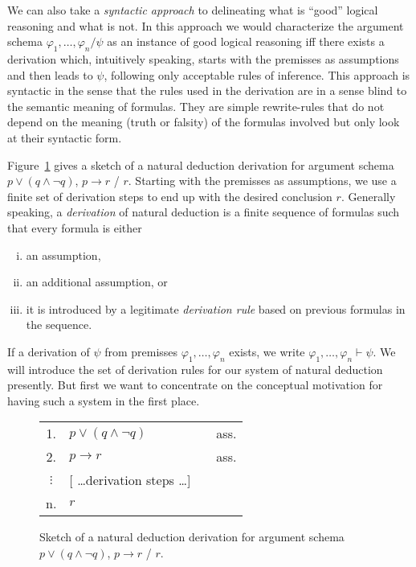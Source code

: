 \documentclass[nobib,nofonts]{tufte-handout}
\newcommand{\mygray}[1]{\textcolor{mygray2}{#1}}
\begin{document}
We can also take a \emph{syntactic approach} to delineating what is ``good'' logical reasoning and what is not.
In this approach we would characterize the argument schema $\varphi_{1}, \dots, \varphi_{n} / \psi$ as an instance of good logical reasoning iff there exists a derivation which, intuitively speaking, starts with the premisses as assumptions and then leads to $\psi$, following only acceptable rules of inference.
This approach is syntactic in the sense that the rules used in the derivation are in a sense blind to the semantic meaning of formulas.
They are simple rewrite-rules that do not depend on the meaning (truth or falsity) of the formulas involved but only look at their syntactic form.



Figure~\ref{fig:deduction-schema} gives a sketch of a natural deduction derivation for argument schema $p \vee (q \wedge \neg q)$, $p \rightarrow r$ / $r$.
Starting with the premisses as assumptions, we use a finite set of derivation steps to end up with the desired conclusion $r$.
Generally speaking, a \emph{derivation} of natural deduction is a finite sequence of formulas such that every formula is either
\begin{enumerate}[(i)]
  \item an assumption,
  \item an additional assumption, or
  \item it is introduced by a legitimate \emph{derivation rule} based on previous formulas in the sequence.
\end{enumerate}
If a derivation of $\psi$ from premisses $\varphi_{1}, \dots, \varphi_{n}$ exists, we write $\varphi_{1}, \dots, \varphi_{n} \vdash \psi$.
We will introduce the set of derivation rules for our system of natural deduction presently. But first we want to concentrate on the conceptual motivation for having such a system in the first place.

\begin{figure}
  \centering
  \begin{tabular}{clcl}
  1. & $p \vee (q \wedge \neg q)$ & & ass. \\
  2. & $p \rightarrow r$ & & ass. \\
  $\vdots$ & \mygray{[ \dots derivation steps \dots]} & &   \\
  n. & $r$ & &   \\
\end{tabular}
\caption{Sketch of a natural deduction derivation for argument schema $p \vee (q \wedge \neg q)$, $p \rightarrow r$ / $r$.}
\label{fig:deduction-schema}
\end{figure}
\end{document}
